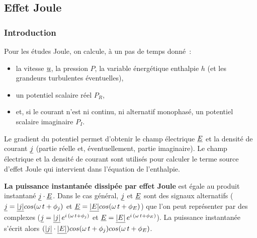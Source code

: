 \subsection*{Effet Joule}

\subsubsection*{Introduction}

Pour les \'etudes Joule, on calcule,
\`a un pas de temps donn\'e~:
\begin{itemize}
\item la vitesse $\underline{u}$, la pression $P$, la variable \'energ\'etique
enthalpie $h$ (et les grandeurs turbulentes \'eventuelles),
\item un potentiel scalaire r\'eel $P_R$,
\item et, si le courant n'est ni continu, ni alternatif
monophas\'e, un potentiel scalaire imaginaire $P_I$.
\end{itemize}

\bigskip
Le gradient du potentiel permet d'obtenir  le champ \'electrique $\underline{E}$ et
la densit\'e de courant $\underline{j}$ (partie r\'eelle et, \'eventuellement, partie
imaginaire). Le champ \'electrique et la
densit\'e de courant sont utilis\'es pour calculer le
terme source d'effet Joule qui intervient dans l'\'equation de l'enthalpie.

{\bf La puissance instantan\'ee dissip\'ee par effet Joule} est \'egale
au produit instantan\'e $\underline{j}\cdot\underline{E}$.
Dans le cas g\'en\'eral, $\underline{j}$ et $\underline{E}$ sont des signaux alternatifs
($\underline{j}=\underline{|j|}cos(\omega\,t+\phi_j)$ et
$\underline{E}=\underline{|E|}cos(\omega\,t+\phi_E)$) que l'on peut repr\'esenter
par des complexes
($\underline{j}=\underline{|j|}\,e^{i\,(\omega\,t+\phi_j)}$  et
$\underline{E}=\underline{|E|}\,e^{i\,(\omega\,t+\phi_E)}$).
La puissance instantan\'ee s'\'ecrit alors
$(\underline{|j|}\cdot\underline{|E|})cos(\omega\,t+\phi_j)cos(\omega\,t+\phi_E)$.

